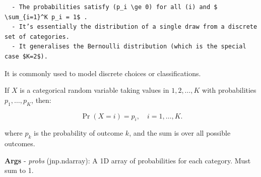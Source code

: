 \documentclass[
  letterpaper,
  DIV=11,
  numbers=noendperiod]{scrartcl}
\begin{document}
\begin{verbatim}
  - The probabilities satisfy (p_i \ge 0) for all (i) and $ \sum_{i=1}^K p_i = 1$ . 
  - It’s essentially the distribution of a single draw from a discrete set of categories. 
  - It generalises the Bernoulli distribution (which is the special case $K=2$).
\end{verbatim}

It is commonly used to model discrete choices or classifications.

If \(X\) is a categorical random variable taking values in
\({1, 2, \dots, K}\) with probabilities \(p_1, \dots, p_K\), then:

\[
  \Pr(X = i) = p_i, \quad i = 1,\dots, K.
  \]

where \(p_k\) is the probability of outcome \(k\), and the sum is over
all possible outcomes.

\textbf{Args} - \emph{probs} (jnp.ndarray): A 1D array of probabilities
for each category. Must sum to 1.
\end{document}
